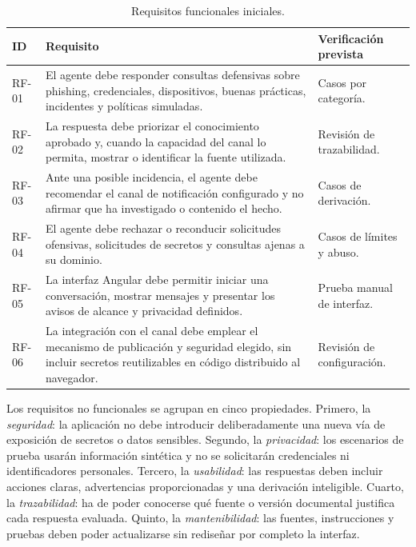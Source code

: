 \begin{table}[H]
\centering
\caption{Requisitos funcionales iniciales.}
\label{tab:requisitos-funcionales}
\begin{tabular}{@{}p{}p{}p{}@{}}
\hline
\textbf{ID} & \textbf{Requisito} & \textbf{Verificación prevista}\\
\hline
RF-01 & El agente debe responder consultas defensivas sobre phishing,
credenciales, dispositivos, buenas prácticas, incidentes y políticas simuladas.
& Casos por categoría.\\
RF-02 & La respuesta debe priorizar el conocimiento aprobado y, cuando la
capacidad del canal lo permita, mostrar o identificar la fuente utilizada. &
Revisión de trazabilidad.\\
RF-03 & Ante una posible incidencia, el agente debe recomendar el canal de
notificación configurado y no afirmar que ha investigado o contenido el hecho.
& Casos de derivación.\\
RF-04 & El agente debe rechazar o reconducir solicitudes ofensivas, solicitudes
de secretos y consultas ajenas a su dominio. & Casos de límites y abuso.\\
RF-05 & La interfaz Angular debe permitir iniciar una conversación, mostrar
mensajes y presentar los avisos de alcance y privacidad definidos. & Prueba
manual de interfaz.\\
RF-06 & La integración con el canal debe emplear el mecanismo de publicación y
seguridad elegido, sin incluir secretos reutilizables en código distribuido al
navegador. & Revisión de configuración.\\
\hline
\end{tabular}
\end{table}

Los requisitos no funcionales se agrupan en cinco propiedades. Primero, la
\emph{seguridad}: la aplicación no debe introducir deliberadamente una nueva vía
de exposición de secretos o datos sensibles. Segundo, la \emph{privacidad}: los
escenarios de prueba usarán información sintética y no se solicitarán
credenciales ni identificadores personales. Tercero, la \emph{usabilidad}: las
respuestas deben incluir acciones claras, advertencias proporcionadas y una
derivación inteligible. Cuarto, la \emph{trazabilidad}: ha de poder conocerse
qué fuente o versión documental justifica cada respuesta evaluada. Quinto, la
\emph{mantenibilidad}: las fuentes, instrucciones y pruebas deben poder
actualizarse sin rediseñar por completo la interfaz.


